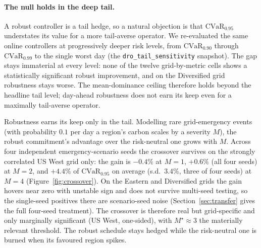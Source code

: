 \documentclass[12pt]{article}
\newcommand{\CVaR}{\mathrm{CVaR}}
\begin{document}
\paragraph{The null holds in the deep tail.} A robust controller is a tail hedge, so a
natural objection is that $\CVaR_{0.95}$ understates its value for a more tail-averse
operator. We re-evaluated the same online controllers at progressively deeper risk
levels, from $\CVaR_{0.90}$ through $\CVaR_{0.99}$ to the single worst day (the
\texttt{dro\_tail\_sensitivity} snapshot). The gap stays immaterial at every level: none
of the twelve grid-by-metric cells shows a statistically significant robust improvement,
and on the Diversified grid robustness stays worse. The mean-dominance ceiling therefore
holds beyond the headline tail level; day-ahead robustness does not earn its keep even
for a maximally tail-averse operator.

Robustness earns its keep only in the tail. Modelling rare grid-emergency events (with
probability $0.1$ per day a region's carbon scales by a severity $M$), the robust
commitment's advantage over the risk-neutral one grows with $M$. Across four
independent emergency-scenario seeds the crossover survives on the strongly correlated
US West grid only: the gain is $-0.4\%$ at $M=1$, $+0.6\%$ (all four seeds) at $M=2$, and
$+4.4\%$ of $\CVaR_{0.95}$ on average (s.d.\ $3.4\%$, three of four seeds) at $M=4$
(Figure~\ref{fig:crossover}). On the Eastern and Diversified grids the gain hovers near
zero with unstable sign and does not survive multi-seed testing, so the single-seed
positives there are scenario-seed noise (Section~\ref{sec:transfer} gives the full
four-seed treatment). The crossover is therefore real but grid-specific and only
marginally significant (US West, one-sided), with $M^\star\approx3$ the materially
relevant threshold. The robust schedule stays hedged while the risk-neutral one is
burned when its favoured region spikes.
\end{document}
